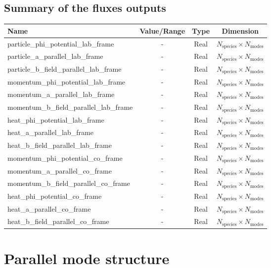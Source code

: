 \documentclass[fleqn]{report}
\begin{document}
\subsection{Summary of the fluxes outputs}
\begin{tabularx}{\textwidth}{|L|S|S|S|}
\hline
Name & Value/Range & Type & Dimension \\
\hline
particle\_phi\_potential\_lab\_frame & - & Real & $N_\textrm{species}\times N_\textrm{modes}$\\ 
particle\_a\_parallel\_lab\_frame & - & Real & $N_\textrm{species}\times N_\textrm{modes}$\\ 
particle\_b\_field\_parallel\_lab\_frame & - & Real & $N_\textrm{species}\times N_\textrm{modes}$\\ 
momentum\_phi\_potential\_lab\_frame & - & Real & $N_\textrm{species}\times N_\textrm{modes}$\\ 
momentum\_a\_parallel\_lab\_frame & - & Real & $N_\textrm{species}\times N_\textrm{modes}$\\ 
momentum\_b\_field\_parallel\_lab\_frame & - & Real & $N_\textrm{species}\times N_\textrm{modes}$\\ 
heat\_phi\_potential\_lab\_frame & - & Real & $N_\textrm{species}\times N_\textrm{modes}$\\ 
heat\_a\_parallel\_lab\_frame & - & Real & $N_\textrm{species}\times N_\textrm{modes}$\\ 
heat\_b\_field\_parallel\_lab\_frame & - & Real & $N_\textrm{species}\times N_\textrm{modes}$\\ 
momentum\_phi\_potential\_co\_frame & - & Real & $N_\textrm{species}\times N_\textrm{modes}$\\ 
momentum\_a\_parallel\_co\_frame & - & Real & $N_\textrm{species}\times N_\textrm{modes}$\\ 
momentum\_b\_field\_parallel\_co\_frame & - & Real & $N_\textrm{species}\times N_\textrm{modes}$\\ 
heat\_phi\_potential\_co\_frame & - & Real & $N_\textrm{species}\times N_\textrm{modes}$\\ 
heat\_a\_parallel\_co\_frame & - & Real & $N_\textrm{species}\times N_\textrm{modes}$\\ 
heat\_b\_field\_parallel\_co\_frame & - & Real & $N_\textrm{species}\times N_\textrm{modes}$\\ 
\hline
\end{tabularx}

\section{Parallel mode structure}
\end{document}
